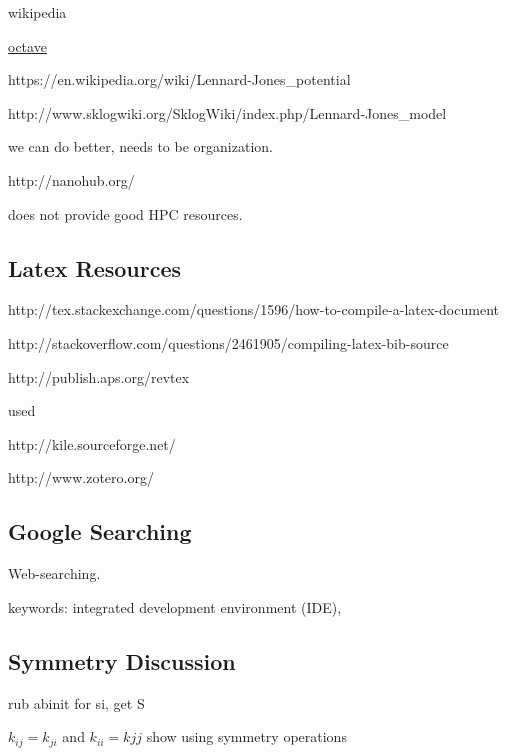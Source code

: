 \documentclass[letterpaper,12pt,amsmath,amssymb]{article}
\begin{document}
wikipedia

\href{http://www.sklogwiki.org/SklogWiki/index.php/Main_Page}
{octave}

https://en.wikipedia.org/wiki/Lennard-Jones_potential

http://www.sklogwiki.org/SklogWiki/index.php/Lennard-Jones_model

we can do better, needs to be organization. 

http://nanohub.org/

does not provide good HPC resources. 

\subsection{Latex Resources}

http://tex.stackexchange.com/questions/1596/how-to-compile-a-latex-document

http://stackoverflow.com/questions/2461905/compiling-latex-bib-source

http://publish.aps.org/revtex

used 

http://kile.sourceforge.net/

http://www.zotero.org/







\subsection{Google Searching}

Web-searching. 

keywords: integrated development environment (IDE), 

\subsection{Symmetry Discussion}

rub abinit for si, get S

$k_{ij} = k_{ji}$  and $k_{ii} = k{jj}$ show using symmetry operations
\end{document}
